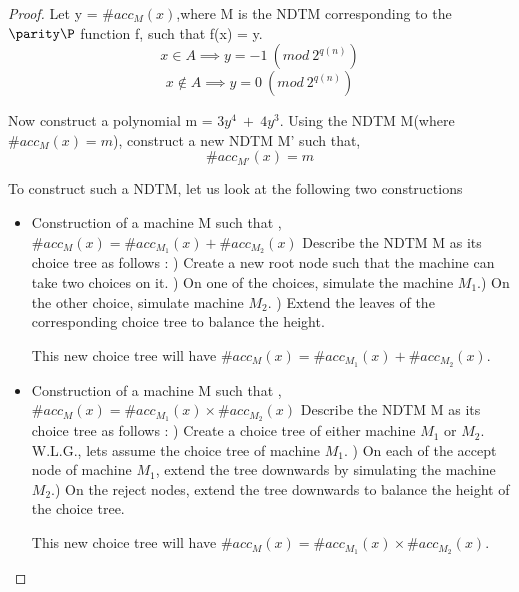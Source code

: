 \begin{proof}
 Let y = $\#acc_{M}(x)$,where M is the NDTM corresponding to the $\parity \P$ function f, such that f(x) = y. \newline
 $$x \in A \implies y = -1~(mod~2^{q(n)})$$ 
$$x \notin A \implies y = 0~(mod~2^{q(n)})$$
 
 Now construct a polynomial m = $3y^{4}~+~4y^{3}$. Using the NDTM M(where $\#acc_{M}(x) = m$), construct a new NDTM M' such that,
 $$\#acc_{M'}(x) = m$$
 
  To construct such a NDTM, let us look at the following two constructions
  \begin{itemize}
   \item 
    Construction of a machine M such that , $\#acc_{M}(x) = \#acc_{M_{1}}(x) + \#acc_{M_{2}}(x)$ \newline
    Describe the NDTM M as its choice tree as follows : ) Create a new root node such that the machine can take two choices on it. ) On one of the choices, simulate the machine $M_{1}$.) On the other choice, simulate machine $M_{2}$. ) Extend the leaves of the corresponding choice tree to balance the height. \newline
    
    This new choice tree will have $\#acc_{M}(x) = \#acc_{M_{1}}(x) + \#acc_{M_{2}}(x)$.
    \item
    Construction of a machine M such that , $\#acc_{M}(x) = \#acc_{M_{1}}(x) \times \#acc_{M_{2}}(x)$ \newline
    Describe the NDTM M as its choice tree as follows : ) Create a choice tree of either machine $M_{1}$ or $M_{2}$. W.L.G., lets assume the choice tree of machine $M_{1}$. ) On each of the accept node of machine $M_{1}$, extend the tree downwards by simulating the machine $M_{2}$.) On the reject nodes, extend the tree downwards to balance the height of the choice tree. \newline
    
    This new choice tree will have $\#acc_{M}(x) = \#acc_{M_{1}}(x) \times \#acc_{M_{2}}(x)$.
    
  \end{itemize}
  

\end{proof}
